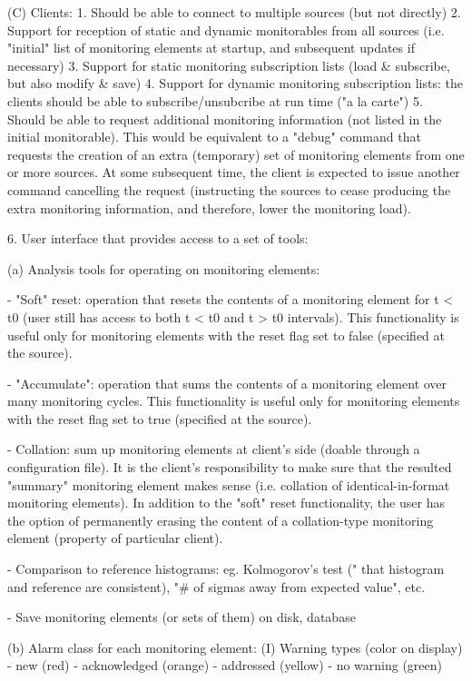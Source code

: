 (C) Clients:
1. Should be able to connect to multiple sources (but not directly) 
2. Support for reception of static and dynamic monitorables from all
sources (i.e. "initial" list of monitoring elements at startup, and
subsequent updates if necessary)
3. Support for static monitoring subscription lists (load & subscribe,
but also modify & save)
4. Support for dynamic monitoring subscription lists: the clients
should be able to subscribe/unsubcribe at run time ("a la carte")
5. Should be able to request additional monitoring information (not
listed in the initial monitorable). This would be equivalent to a "debug"
command that requests the creation of an extra (temporary) set of
monitoring elements from one or more sources. At some subsequent time,
the client is expected to issue another command cancelling the request
(instructing the sources to cease producing the extra monitoring
information, and therefore, lower the monitoring load).

6. User interface that provides access to a set of tools:

(a) Analysis tools for operating on monitoring elements:

- "Soft" reset: operation that resets the contents of a monitoring
element for t < t0 (user still has access to both t < t0 and t > t0
intervals). This functionality is useful only for monitoring elements
with the reset flag set to false (specified at the source).

- "Accumulate": operation that sums the contents of a monitoring
element over many monitoring cycles. This functionality is useful only
for monitoring elements with the reset flag set to true (specified at
the source).

- Collation: sum up monitoring elements at client's side (doable
through a configuration file). It is the client's responsibility to make
sure that the resulted "summary" monitoring element makes sense
(i.e. collation of identical-in-format monitoring elements). In
addition to the "soft" reset functionality, the user has the option of
permanently erasing the content of a collation-type monitoring element
(property of particular client).

- Comparison to reference histograms: eg. Kolmogorov's test ("%
that histogram and reference are consistent), "# of sigmas away from
expected value", etc.

- Save monitoring elements (or sets of them) on disk, database

(b) Alarm class for each monitoring element:
(I) Warning types (color on display)
- new (red)
- acknowledged (orange)
- addressed (yellow)
- no warning (green)

